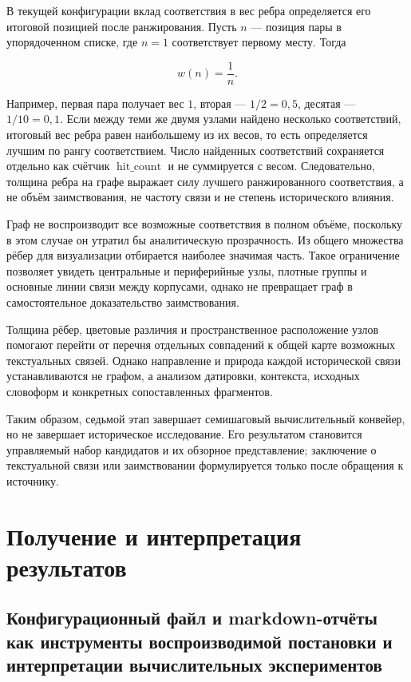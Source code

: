 В текущей конфигурации вклад соответствия в вес ребра определяется его итоговой позицией после ранжирования. Пусть $n$ --- позиция пары в упорядоченном списке, где $n=1$ соответствует первому месту. Тогда

\begin{equation}
w(n)=\frac{1}{n}.
\end{equation}

Например, первая пара получает вес $1$, вторая --- $1/2=0{,}5$, десятая --- $1/10=0{,}1$. Если между теми же двумя узлами найдено несколько соответствий, итоговый вес ребра равен наибольшему из их весов, то есть определяется лучшим по рангу соответствием. Число найденных соответствий сохраняется отдельно как счётчик $\operatorname{hit\_count}$ и не суммируется с весом. Следовательно, толщина ребра на графе выражает силу лучшего ранжированного соответствия, а не объём заимствования, не частоту связи и не степень исторического влияния.

Граф не воспроизводит все возможные соответствия в полном объёме, поскольку в этом случае он утратил бы аналитическую прозрачность. Из общего множества рёбер для визуализации отбирается наиболее значимая часть. Такое ограничение позволяет увидеть центральные и периферийные узлы, плотные группы и основные линии связи между корпусами, однако не превращает граф в самостоятельное доказательство заимствования.

Толщина рёбер, цветовые различия и пространственное расположение узлов помогают перейти от перечня отдельных совпадений к общей карте возможных текстуальных связей. Однако направление и природа каждой исторической связи устанавливаются не графом, а анализом датировки, контекста, исходных словоформ и конкретных сопоставленных фрагментов.

Таким образом, седьмой этап завершает семишаговый вычислительный конвейер, но не завершает историческое исследование. Его результатом становится управляемый набор кандидатов и их обзорное представление; заключение о текстуальной связи или заимствовании формулируется только после обращения к источнику.

\section{Получение и интерпретация результатов}

\subsection{Конфигурационный файл и markdown-отчёты как инструменты воспроизводимой постановки и интерпретации вычислительных экспериментов}

